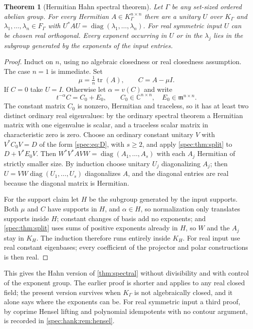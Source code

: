 \documentclass[11pt,a4paper]{article}
\numberwithin{equation}{section}
\newtheorem{theorem}{Theorem}[section]
\theoremstyle{definition}
\theoremstyle{remark}
\newcommand{\C}{\mathbb C}
\newcommand{\mm}{\mathfrak m}
\newcommand{\tr}{\operatorname{tr}}
\newcommand{\diag}{\operatorname{diag}}
\begin{document}
\begin{theorem}[Hermitian Hahn spectral theorem]\label{spec:thm:hermitian}
Let $\Gamma$ be any set-sized ordered abelian group. For every Hermitian
$A\in K_\Gamma^{n\times n}$ there are a unitary $U$ over $K_\Gamma$ and
$\lambda_1,\ldots,\lambda_n\in F_\Gamma$ with
$U^*AU=\diag(\lambda_1,\ldots,\lambda_n)$. For real symmetric input $U$ can
be chosen real orthogonal. Every exponent occurring in $U$ or in the
$\lambda_j$ lies in the subgroup generated by the exponents of the input
entries.
\end{theorem}
\begin{proof}
Induct on $n$, using no algebraic closedness or real closedness assumption.
The case $n=1$ is immediate. Set
\begin{equation}\label{spec:eq:tracesubtract}
 \mu=\tfrac1n\tr(A),\qquad C=A-\mu I.
\end{equation}
If $C=0$ take $U=I$. Otherwise let $\alpha=v(C)$ and write
\begin{equation}\label{spec:eq:normalize}
 t^{-\alpha}C=C_0+E_0,\qquad C_0\in\C^{n\times n},\quad
 E_0\in\mm^{n\times n}.
\end{equation}
The constant matrix $C_0$ is nonzero, Hermitian and traceless, so it has at
least two distinct ordinary real eigenvalues: by the ordinary spectral
theorem a Hermitian matrix with one eigenvalue is scalar, and a traceless
scalar matrix in characteristic zero is zero. Choose an ordinary constant
unitary $V$ with $V^*C_0V=D$ of the form \eqref{spec:eq:D}, with $s\ge2$,
and apply \cref{spec:thm:split} to $D+V^*E_0V$. Then
$W^*V^*AVW=\diag(A_1,\ldots,A_s)$ with each $A_j$ Hermitian of strictly
smaller size. By induction choose unitary $U_j$ diagonalizing $A_j$; then
$U=VW\diag(U_1,\ldots,U_s)$ diagonalizes $A$, and the diagonal entries are
real because the diagonal matrix is Hermitian.

For the support claim let $H$ be the subgroup generated by the input
supports. Both $\mu$ and $C$ have supports in $H$, and $\alpha\in H$, so
normalization only translates supports inside $H$; constant changes of basis
add no exponents; and \cref{spec:thm:split} uses sums of positive exponents
already in $H$, so $W$ and the $A_j$ stay in $K_H$. The induction therefore
runs entirely inside $K_H$. For real input use real constant eigenbases;
every coefficient of the projector and polar constructions is then real.
\end{proof}

This gives the Hahn version of \cref{thm:spectral} without divisibility and
with control of the exponent group. The earlier proof is shorter and applies
to any real closed field; the present version
survives when $K_\Gamma$ is not algebraically closed, and it alone says
where the exponents can be. For real symmetric input a third proof, by coprime
Hensel lifting and polynomial idempotents with no contour argument, is
recorded in \cref{spec:hank:rem:hensel}.
\end{document}
